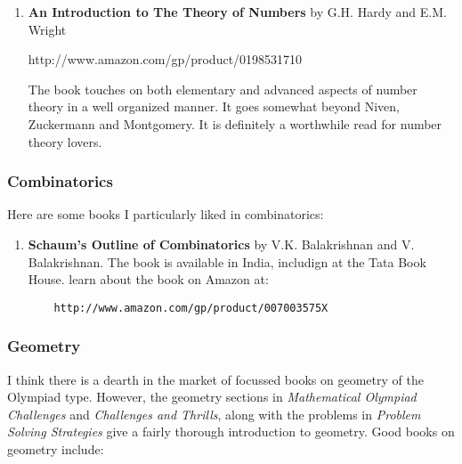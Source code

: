 \documentclass[a4paper]{amsart}
\begin{document}
\begin{enumerate}
\item {\bf An Introduction to The Theory of Numbers} by G.H. Hardy and E.M. Wright

  http://www.amazon.com/gp/product/0198531710

  The book touches on both elementary and advanced aspects of number theory in a well organized manner. It goes somewhat
  beyond Niven, Zuckermann and Montgomery. It is definitely a worthwhile read for number theory lovers.
\end{enumerate}

\subsubsection{Combinatorics}

Here are some books I particularly liked in combinatorics:

\begin{enumerate}

\item {\bf Schaum's Outline of Combinatorics} by V.K. Balakrishnan and V. Balakrishnan. The book is available in India, includign at the
  Tata Book House. learn about the book on Amazon at:

  \begin{verbatim}
    http://www.amazon.com/gp/product/007003575X
  \end{verbatim}
\end{enumerate}

\subsubsection{Geometry}

I think there is a dearth in the market of focussed books on geometry of the Olympiad type. However, the geometry sections in
{\em Mathematical Olympiad Challenges} and {\em Challenges and Thrills}, along with the problems in {\em Problem Solving Strategies}
give a fairly thorough introduction to geometry. Good books on geometry include:
\end{document}
